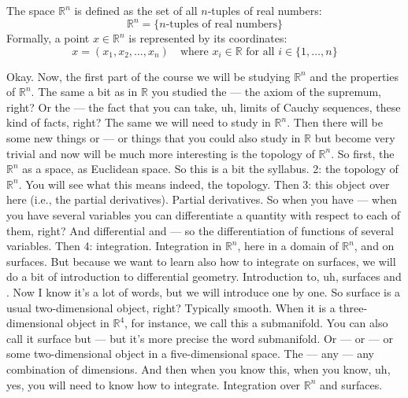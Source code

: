 \begin{math-stroke}
\begin{definition*}
The space $\mathbb{R}^n$ is defined as the set of all $n$-tuples of real numbers:
\[ \mathbb{R}^n = \{ n\text{-tuples of real numbers} \} \]
Formally, a point $x \in \mathbb{R}^n$ is represented by its coordinates:
\[ x = (x_1, x_2, \dots, x_n) \quad \text{where } x_i \in \mathbb{R} \text{ for all } i \in \{1, \dots, n\} \]
\end{definition*}
\end{math-stroke}

\begin{spoken-clean}[00:17:38 - 00:21:13]
Okay. Now, the first part of the course we will be studying $\mathbb{R}^n$ and the properties of $\mathbb{R}^n$. The same a bit as in $\mathbb{R}$ you studied the — the axiom of the supremum, right? Or the — the fact that you can take, uh, limits of Cauchy sequences, these kind of facts, right? The same we will need to study in $\mathbb{R}^n$. Then there will be some new things or — or things that you could also study in $\mathbb{R}$ but become very trivial and now will be much more interesting is the topology of $\mathbb{R}^n$. So first, the $\mathbb{R}^n$ as a space, as Euclidean space. So this is a bit the syllabus. 2: the topology of $\mathbb{R}^n$. You will see what this means indeed, the topology. Then 3: this object over here  (i.e., the partial derivatives). Partial derivatives. So when you have — when you have several variables you can differentiate a quantity with respect to each of them, right? And differential and — so the differentiation of functions of several variables. Then 4: integration. Integration in $\mathbb{R}^n$, here in a domain of $\mathbb{R}^n$, and on surfaces. But because we want to learn also how to integrate on surfaces, we will do a bit of introduction to differential geometry. Introduction to, uh, surfaces and . Now I know it's a lot of words, but we will introduce one by one. So surface is a usual two-dimensional object, right? Typically smooth. When it is a three-dimensional object in $\mathbb{R}^4$, for instance, we call this a submanifold. You can also call it surface but — but it's more precise the word submanifold. Or — or — or some two-dimensional object in a five-dimensional space. The — any — any combination of dimensions. And then when you know this, when you know, uh, yes, you will need to know how to integrate. Integration over $\mathbb{R}^n$ and surfaces.
\end{spoken-clean}

